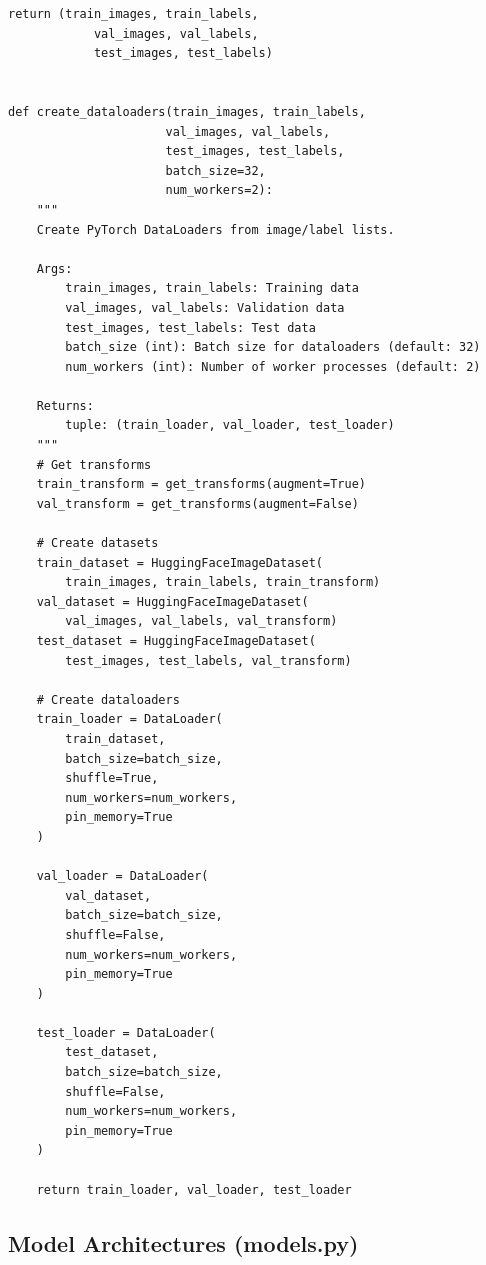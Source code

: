 \documentclass[man,12pt,letterpaper,donotrepeattitle,floatsintext]{apa7}
\begin{document}
\begin{lstlisting}[style=pythonstyle]
    return (train_images, train_labels,
            val_images, val_labels,
            test_images, test_labels)


def create_dataloaders(train_images, train_labels,
                      val_images, val_labels,
                      test_images, test_labels,
                      batch_size=32,
                      num_workers=2):
    """
    Create PyTorch DataLoaders from image/label lists.
    
    Args:
        train_images, train_labels: Training data
        val_images, val_labels: Validation data
        test_images, test_labels: Test data
        batch_size (int): Batch size for dataloaders (default: 32)
        num_workers (int): Number of worker processes (default: 2)
    
    Returns:
        tuple: (train_loader, val_loader, test_loader)
    """
    # Get transforms
    train_transform = get_transforms(augment=True)
    val_transform = get_transforms(augment=False)
    
    # Create datasets
    train_dataset = HuggingFaceImageDataset(
        train_images, train_labels, train_transform)
    val_dataset = HuggingFaceImageDataset(
        val_images, val_labels, val_transform)
    test_dataset = HuggingFaceImageDataset(
        test_images, test_labels, val_transform)
    
    # Create dataloaders
    train_loader = DataLoader(
        train_dataset,
        batch_size=batch_size,
        shuffle=True,
        num_workers=num_workers,
        pin_memory=True
    )
    
    val_loader = DataLoader(
        val_dataset,
        batch_size=batch_size,
        shuffle=False,
        num_workers=num_workers,
        pin_memory=True
    )
    
    test_loader = DataLoader(
        test_dataset,
        batch_size=batch_size,
        shuffle=False,
        num_workers=num_workers,
        pin_memory=True
    )
    
    return train_loader, val_loader, test_loader
\end{lstlisting}

\subsection{Model Architectures (models.py)}
\end{document}
